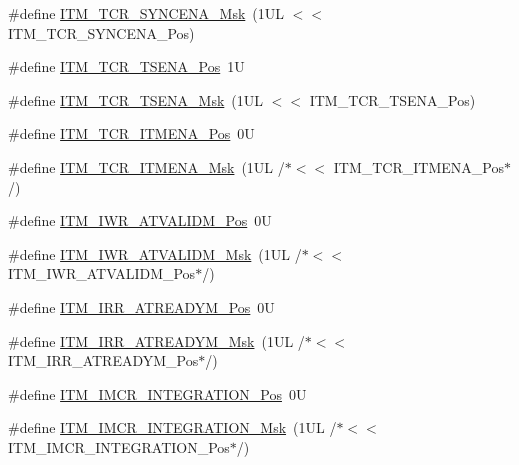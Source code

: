 \begin{DoxyCompactItemize}
\item 
\#define \mbox{\hyperlink{group___c_m_s_i_s___i_t_m_gac89b74a78701c25b442105d7fe2bbefb}{I\+T\+M\+\_\+\+T\+C\+R\+\_\+\+S\+Y\+N\+C\+E\+N\+A\+\_\+\+Msk}}~(1\+U\+L $<$$<$ I\+T\+M\+\_\+\+T\+C\+R\+\_\+\+S\+Y\+N\+C\+E\+N\+A\+\_\+\+Pos)
\item 
\#define \mbox{\hyperlink{group___c_m_s_i_s___i_t_m_ga5aa381845f810114ab519b90753922a1}{I\+T\+M\+\_\+\+T\+C\+R\+\_\+\+T\+S\+E\+N\+A\+\_\+\+Pos}}~1U
\item 
\#define \mbox{\hyperlink{group___c_m_s_i_s___i_t_m_ga436b2e8fa24328f48f2da31c00fc9e65}{I\+T\+M\+\_\+\+T\+C\+R\+\_\+\+T\+S\+E\+N\+A\+\_\+\+Msk}}~(1\+U\+L $<$$<$ I\+T\+M\+\_\+\+T\+C\+R\+\_\+\+T\+S\+E\+N\+A\+\_\+\+Pos)
\item 
\#define \mbox{\hyperlink{group___c_m_s_i_s___i_t_m_ga3286b86004bce7ffe17ee269f87f8d9d}{I\+T\+M\+\_\+\+T\+C\+R\+\_\+\+I\+T\+M\+E\+N\+A\+\_\+\+Pos}}~0U
\item 
\#define \mbox{\hyperlink{group___c_m_s_i_s___i_t_m_ga7dd53e3bff24ac09d94e61cb595cb2d9}{I\+T\+M\+\_\+\+T\+C\+R\+\_\+\+I\+T\+M\+E\+N\+A\+\_\+\+Msk}}~(1\+U\+L /$\ast$$<$$<$ I\+T\+M\+\_\+\+T\+C\+R\+\_\+\+I\+T\+M\+E\+N\+A\+\_\+\+Pos$\ast$/)
\item 
\#define \mbox{\hyperlink{group___c_m_s_i_s___i_t_m_ga04d3f842ad48f6a9127b4cecc963e1d7}{I\+T\+M\+\_\+\+I\+W\+R\+\_\+\+A\+T\+V\+A\+L\+I\+D\+M\+\_\+\+Pos}}~0U
\item 
\#define \mbox{\hyperlink{group___c_m_s_i_s___i_t_m_ga67b969f8f04ed15886727788f0e2ffd7}{I\+T\+M\+\_\+\+I\+W\+R\+\_\+\+A\+T\+V\+A\+L\+I\+D\+M\+\_\+\+Msk}}~(1\+U\+L /$\ast$$<$$<$ I\+T\+M\+\_\+\+I\+W\+R\+\_\+\+A\+T\+V\+A\+L\+I\+D\+M\+\_\+\+Pos$\ast$/)
\item 
\#define \mbox{\hyperlink{group___c_m_s_i_s___i_t_m_ga259edfd1d2e877a62e06d7a240df97f4}{I\+T\+M\+\_\+\+I\+R\+R\+\_\+\+A\+T\+R\+E\+A\+D\+Y\+M\+\_\+\+Pos}}~0U
\item 
\#define \mbox{\hyperlink{group___c_m_s_i_s___i_t_m_ga3dbc3e15f5bde2669cd8121a1fe419b9}{I\+T\+M\+\_\+\+I\+R\+R\+\_\+\+A\+T\+R\+E\+A\+D\+Y\+M\+\_\+\+Msk}}~(1\+U\+L /$\ast$$<$$<$ I\+T\+M\+\_\+\+I\+R\+R\+\_\+\+A\+T\+R\+E\+A\+D\+Y\+M\+\_\+\+Pos$\ast$/)
\item 
\#define \mbox{\hyperlink{group___c_m_s_i_s___i_t_m_ga08de02bf32caf48aaa29f7c68ff5d755}{I\+T\+M\+\_\+\+I\+M\+C\+R\+\_\+\+I\+N\+T\+E\+G\+R\+A\+T\+I\+O\+N\+\_\+\+Pos}}~0U
\item 
\#define \mbox{\hyperlink{group___c_m_s_i_s___i_t_m_ga8838bd3dd04c1a6be97cd946364a3fd2}{I\+T\+M\+\_\+\+I\+M\+C\+R\+\_\+\+I\+N\+T\+E\+G\+R\+A\+T\+I\+O\+N\+\_\+\+Msk}}~(1\+U\+L /$\ast$$<$$<$ I\+T\+M\+\_\+\+I\+M\+C\+R\+\_\+\+I\+N\+T\+E\+G\+R\+A\+T\+I\+O\+N\+\_\+\+Pos$\ast$/)

\end{DoxyCompactItemize}
